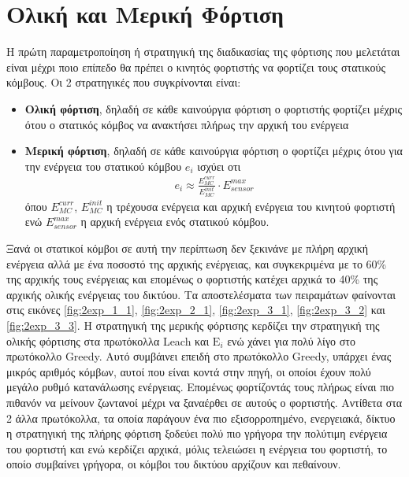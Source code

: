 \section{Ολική και Μερική Φόρτιση}\label{sc:result2}
Η πρώτη παραμετροποίηση ή στρατηγική της διαδικασίας της φόρτισης που μελετάται είναι μέχρι ποιο επίπεδο θα πρέπει ο κινητός φορτιστής να φορτίζει τους στατικούς
κόμβους. Οι 2 στρατηγικές που συγκρίνονται είναι:
\begin{itemize}
  \item \textbf{Oλική φόρτιση}, δηλαδή σε κάθε καινούργια φόρτιση ο φορτιστής φορτίζει μέχρις ότου ο στατικός κόμβος να ανακτήσει πλήρως την αρχική του ενέργεια
  \item \textbf{Μερική φόρτιση}, δηλαδή σε κάθε καινούργια φόρτιση ο φορτίζει μέχρις ότου για την ενέργεια του στατικού κόμβου $e_{i}$ ισχύει οτι
\begin{align*}
e_{i} \approx \frac{E^{curr}_{MC}}{E^{init}_{MC}}\cdot E^{max}_{sensor}
\end{align*}
όπου $E^{curr}_{MC}$, $E^{init}_{MC}$ η τρέχουσα ενέργεια και αρχική ενέργεια του κινητού φορτιστή ενώ $E^{max}_{sensor}$ η αρχική ενέργεια ενός στατικού κόμβου.
\end{itemize}
Ξανά οι στατικοί κόμβοι σε αυτή την περίπτωση δεν ξεκινάνε με πλήρη αρχική ενέργεια αλλά με ένα ποσοστό της αρχικής ενέργειας, και συγκεκριμένα
με το 60\% της αρχικής τους ενέργειας και επομένως ο φορτιστής κατέχει αρχικά το 40\% της αρχικής ολικής ενέργειας του δικτύου. Τα αποστελέσματα των πειραμάτων
φαίνονται στις εικόνες \ref{fig:2exp_1_1}, \ref{fig:2exp_2_1}, \ref{fig:2exp_3_1}, \ref{fig:2exp_3_2} και \ref{fig:2exp_3_3}. Η στρατηγική της μερικής φόρτισης
κερδίζει την στρατηγική της ολικής φόρτισης στα πρωτόκολλα Leach και $\text{E}_{i}$ ενώ χάνει για πολύ λίγο στο πρωτόκολλο Greedy. Αυτό συμβάινει επειδή στο
πρωτόκολλο Greedy, υπάρχει ένας μικρός αριθμός κόμβων, αυτοί που είναι κοντά στην πηγή, οι οποίοι έχουν πολύ μεγάλο ρυθμό κατανάλωσης ενέργειας. Επομένως
φορτίζοντάς τους πλήρως είναι πιο πιθανόν να μείνουν ζωντανοί μέχρι να ξαναέρθει σε αυτούς ο φορτιστής. Αντίθετα στα 2 άλλα πρωτόκολλα, τα οποία παράγουν ένα πιο
εξισορροπημένο, ενεργειακά, δίκτυο η στρατηγική της πλήρης φόρτιση ξοδεύει πολύ πιο γρήγορα την πολύτιμη ενέργεια του φορτιστή και ενώ κερδίζει αρχικά, μόλις
τελειώσει η ενέργεια του φορτιστή, το οποίο συμβαίνει γρήγορα, οι κόμβοι του δικτύου αρχίζουν και πεθαίνουν.


